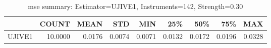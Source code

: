 \begin{table}[ht]
\centering
\caption{mse summary: Estimator=UJIVE1, Instruments=142, Strength=0.30}
\begin{tabular}{lrrrrrrrr}
\toprule
 & COUNT & MEAN & STD & MIN & 25\% & 50\% & 75\% & MAX \\
\midrule
UJIVE1 & 10.0000 & 0.0176 & 0.0074 & 0.0071 & 0.0132 & 0.0172 & 0.0196 & 0.0328 \\
\bottomrule
\end{tabular}
\end{table}
